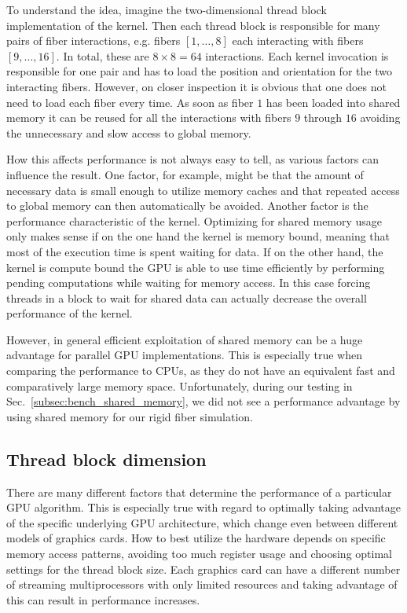 To understand the idea, imagine the two-dimensional thread block implementation of the kernel. Then each thread block is responsible for many pairs of fiber interactions, e.g. fibers $[1,\dots,8]$ each interacting with fibers $[9,\dots,16]$. In total, these are $8 \times 8 = 64$ interactions. Each kernel invocation is responsible for one pair and has to load the position and orientation for the two interacting fibers. However, on closer inspection it is obvious that one does not need to load each fiber every time. As soon as fiber $1$ has been loaded into shared memory it can be reused for all the interactions with fibers $9$ through $16$ avoiding the unnecessary and slow access to global memory.

How this affects performance is not always easy to tell, as various factors can influence the result. One factor, for example, might be that the amount of necessary data is small enough to utilize memory caches and that repeated access to global memory can then automatically be avoided. Another factor is the performance characteristic of the kernel. Optimizing for shared memory usage only makes sense if on the one hand the kernel is memory bound, meaning that most of the execution time is spent waiting for data. If on the other hand, the kernel is compute bound the GPU is able to use time efficiently by performing pending computations while waiting for memory access. In this case forcing threads in a block to wait for shared data can actually decrease the overall performance of the kernel.

However, in general efficient exploitation of shared memory can be a huge advantage for parallel GPU implementations. This is especially true when comparing the performance to CPUs, as they do not have an equivalent fast and comparatively large memory space. Unfortunately, during our testing in Sec.~\ref{subsec:bench_shared_memory}, we did not see a performance advantage by using shared memory for our rigid fiber simulation.

\subsection{Thread block dimension}
\label{subsec:parallel_thread_block}

There are many different factors that determine the performance of a particular GPU algorithm. This is especially true with regard to optimally taking advantage of the specific underlying GPU architecture, which change even between different models of graphics cards. How to best utilize the hardware depends on specific memory access patterns, avoiding too much register usage and choosing optimal settings for the thread block size. Each graphics card can have a different number of streaming multiprocessors with only limited resources and taking advantage of this can result in performance increases.

